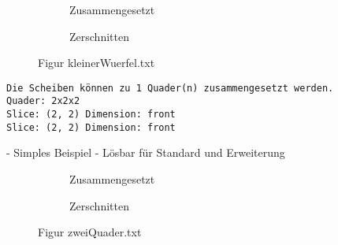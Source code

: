 \documentclass[a4paper,10pt,ngerman]{scrartcl}
\newcommand{\simplecube}[8]%
{
    \begin{scope}[shift={#1}]
        \fill[gray!40,canvas is yz plane at x=#2, opacity=#8] (0,0) rectangle (#3,#4);
        \fill[gray!10,canvas is xz plane at y=#3, opacity=#8] (0,0) rectangle (#2,#4);
        \fill[white  ,canvas is xy plane at z=#4, opacity=#8] (0,0) rectangle (#2,#3);
        \foreach\i/\j in {0/1, 1/1, 1/0}
            {
            \draw[line#5] (0,#3*\i,#4*\j) --++ (#2,0,0);
            \draw[line#6] (#2*\i,0,#4*\j) --++ (0,#3,0);
            \draw[line#7] (#2*\i,#3*\j,0) --++ (0,0,#4);
        }
    \end{scope}
}
\newcommand{\smallSquare}[4]%
{
    \begin{scope}[shift={#1}]
        \simplecube{(0,     0,      0)}     {1}{2}{2}   {a}{a}{a}   {1}
        \simplecube{(1+#4,   0,      0))}    {1}{2}{2}   {a}{a}{a}   {1}
    \end{scope}
}
\newcommand{\unsolvedSquare}[4]%
{
    \begin{scope}[shift={#1}]
        \simplecube{(0,     0,      0)}     {1}{2}{2}   {a}{a}{a}   {1}
        \simplecube{(1+#4,   0,      0))}    {1}{2}{2}   {a}{a}{a}   {1}
        \simplecube{(2+2*#4,   0,      0))}    {1}{1}{1}   {a}{a}{a}   {1}
    \end{scope}
}
\begin{document}
    \begin{figure}[H]
        \centering
        \def\a{3.2}
        \def\b{1.2}
        \begin{subfigure}[b]{0.45\textwidth}
            \centering %
            \caption{Zusammengesetzt}\label{fig:figA2}
        \end{subfigure}
        \begin{subfigure}[b]{0.45\textwidth}
            \centering %
            \caption{Zerschnitten}\label{fig:figB2}
        \end{subfigure}
        \caption{Figur kleinerWuerfel.txt}\label{fig:figAB2}
    \end{figure}

    \begin{lstlisting}[frame=single, title=Programmausgabe kleinerWuerfel.txt, breaklines=true,label={lst:lstlisting3}]
    Die Scheiben können zu 1 Quader(n) zusammengesetzt werden.
Quader: 2x2x2
Slice: (2, 2) Dimension: front
Slice: (2, 2) Dimension: front
    \end{lstlisting}

    - Simples Beispiel
    - Lösbar für Standard und Erweiterung


    \begin{figure}[H]
        \centering
        \def\a{3.2}
        \def\b{1.2}
        \begin{subfigure}[b]{0.45\textwidth}
            \centering %
            \caption{Zusammengesetzt}\label{fig:figA3}
        \end{subfigure}
        \begin{subfigure}[b]{0.45\textwidth}
            \centering %
            \caption{Zerschnitten}\label{fig:figB3}
        \end{subfigure}
        \caption{Figur zweiQuader.txt}\label{fig:figAB3}
    \end{figure}
\end{document}
